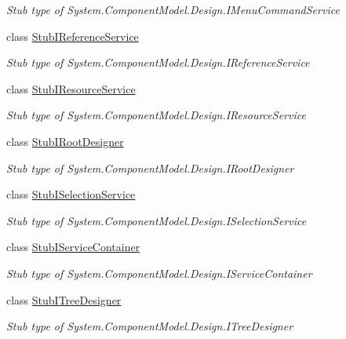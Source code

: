 \begin{DoxyCompactItemize}
\begin{DoxyCompactList}\small\item\em Stub type of System.\-Component\-Model.\-Design.\-I\-Menu\-Command\-Service\end{DoxyCompactList}\item 
class \hyperlink{class_system_1_1_component_model_1_1_design_1_1_fakes_1_1_stub_i_reference_service}{Stub\-I\-Reference\-Service}
\begin{DoxyCompactList}\small\item\em Stub type of System.\-Component\-Model.\-Design.\-I\-Reference\-Service\end{DoxyCompactList}\item 
class \hyperlink{class_system_1_1_component_model_1_1_design_1_1_fakes_1_1_stub_i_resource_service}{Stub\-I\-Resource\-Service}
\begin{DoxyCompactList}\small\item\em Stub type of System.\-Component\-Model.\-Design.\-I\-Resource\-Service\end{DoxyCompactList}\item 
class \hyperlink{class_system_1_1_component_model_1_1_design_1_1_fakes_1_1_stub_i_root_designer}{Stub\-I\-Root\-Designer}
\begin{DoxyCompactList}\small\item\em Stub type of System.\-Component\-Model.\-Design.\-I\-Root\-Designer\end{DoxyCompactList}\item 
class \hyperlink{class_system_1_1_component_model_1_1_design_1_1_fakes_1_1_stub_i_selection_service}{Stub\-I\-Selection\-Service}
\begin{DoxyCompactList}\small\item\em Stub type of System.\-Component\-Model.\-Design.\-I\-Selection\-Service\end{DoxyCompactList}\item 
class \hyperlink{class_system_1_1_component_model_1_1_design_1_1_fakes_1_1_stub_i_service_container}{Stub\-I\-Service\-Container}
\begin{DoxyCompactList}\small\item\em Stub type of System.\-Component\-Model.\-Design.\-I\-Service\-Container\end{DoxyCompactList}\item 
class \hyperlink{class_system_1_1_component_model_1_1_design_1_1_fakes_1_1_stub_i_tree_designer}{Stub\-I\-Tree\-Designer}
\begin{DoxyCompactList}\small\item\em Stub type of System.\-Component\-Model.\-Design.\-I\-Tree\-Designer\end{DoxyCompactList}\item 

\end{DoxyCompactItemize}
